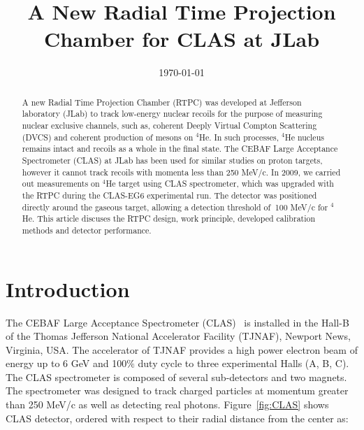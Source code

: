 \documentclass[twocolumn,showpacs,superscriptaddress,groupedaddress]{revtex4}
\begin{document}

\title{\vspace{-15mm}\fontsize{24pt}{10pt}\selectfont\textbf{A New Radial Time 
Projection Chamber for CLAS at JLab}}
  

\date{\today}

\begin{abstract}
A new Radial Time Projection Chamber (RTPC) was developed at Jefferson 
laboratory (JLab) to track low-energy nuclear recoils for the purpose of 
measuring nuclear exclusive channels, such as, coherent Deeply Virtual Compton 
Scattering (DVCS) and coherent production of mesons on $^4$He. In such 
processes, $^4$He nucleus remains intact and recoils as a whole in the final 
state. The CEBAF Large Acceptance Spectrometer (CLAS) at JLab has been used for 
similar studies on proton targets, however it cannot track recoils with momenta 
less than 250 MeV/c. In 2009, we carried out measurements on $^4$He target 
using CLAS spectrometer, which was upgraded with the RTPC during the CLAS-EG6 
experimental run. The detector was positioned directly around the gaseous 
target, allowing a detection threshold of $~$100  MeV/c for $^4$He. This 
article discuses the RTPC design, work principle, developed calibration methods 
and detector performance.
\end{abstract}

\maketitle


\section{Introduction} \label{sec:level1}

The CEBAF Large Acceptance Spectrometer (CLAS)~\cite{CLASref} is installed in 
the Hall-B of the Thomas Jefferson National Accelerator Facility (TJNAF), 
Newport News, Virginia, USA. The accelerator of TJNAF provides a high power 
electron beam of energy up to 6 GeV and 100$\%$ duty cycle to three 
experimental Halls (A, B, C). The CLAS spectrometer is composed of several 
sub-detectors and two magnets. The spectrometer was designed to track charged 
particles at momentum greater than 250 MeV/c as well as detecting real photons.  
Figure~\ref{fig:CLAS} shows CLAS detector, ordered with respect to their radial 
distance from the center as:
\end{document}
